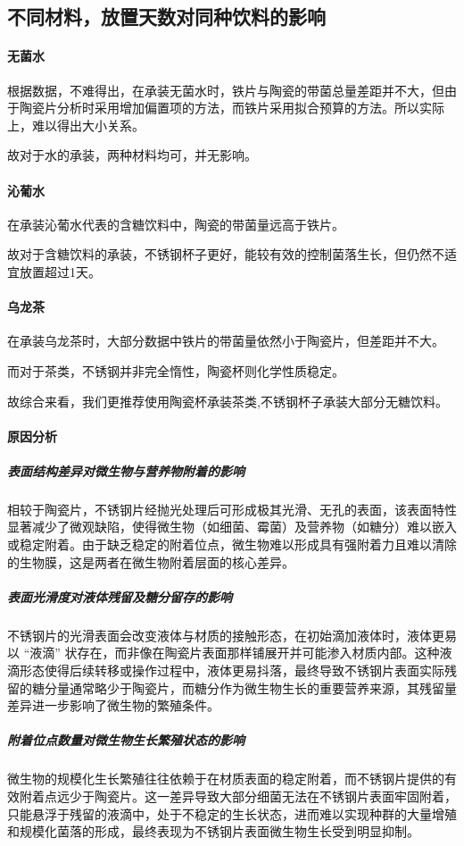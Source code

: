 \documentclass[12pt,a4paper]{ctexart}
\begin{document}
\subsection{不同材料，放置天数对同种饮料的影响}
\paragraph{无菌水}

根据数据，不难得出，在承装无菌水时，铁片与陶瓷的带菌总量差距并不大，但由于陶瓷片分析时采用增加偏置项的方法，而铁片采用拟合预算的方法。所以实际上，难以得出大小关系。

故对于水的承装，两种材料均可，并无影响。


\paragraph{沁葡水}
在承装沁葡水代表的含糖饮料中，陶瓷的带菌量远高于铁片。

故对于含糖饮料的承装，不锈钢杯子更好，能较有效的控制菌落生长，但仍然不适宜放置超过1天。

\paragraph{乌龙茶}
在承装乌龙茶时，大部分数据中铁片的带菌量依然小于陶瓷片，但差距并不大。

而对于茶类，不锈钢并非完全惰性，陶瓷杯则化学性质稳定。

故综合来看，我们更推荐使用陶瓷杯承装茶类,不锈钢杯子承装大部分无糖饮料。

\paragraph{原因分析}
\subparagraph{表面结构差异对微生物与营养物附着的影响}
相较于陶瓷片，不锈钢片经抛光处理后可形成极其光滑、无孔的表面，该表面特性显著减少了微观缺陷，使得微生物（如细菌、霉菌）及营养物（如糖分）难以嵌入或稳定附着。由于缺乏稳定的附着位点，微生物难以形成具有强附着力且难以清除的生物膜，这是两者在微生物附着层面的核心差异。
\subparagraph{表面光滑度对液体残留及糖分留存的影响}
不锈钢片的光滑表面会改变液体与材质的接触形态，在初始滴加液体时，液体更易以 “液滴” 状存在，而非像在陶瓷片表面那样铺展开并可能渗入材质内部。这种液滴形态使得后续转移或操作过程中，液体更易抖落，最终导致不锈钢片表面实际残留的糖分量通常略少于陶瓷片，而糖分作为微生物生长的重要营养来源，其残留量差异进一步影响了微生物的繁殖条件。
\subparagraph{附着位点数量对微生物生长繁殖状态的影响}
微生物的规模化生长繁殖往往依赖于在材质表面的稳定附着，而不锈钢片提供的有效附着点远少于陶瓷片。这一差异导致大部分细菌无法在不锈钢片表面牢固附着，只能悬浮于残留的液滴中，处于不稳定的生长状态，进而难以实现种群的大量增殖和规模化菌落的形成，最终表现为不锈钢片表面微生物生长受到明显抑制。
\end{document}
